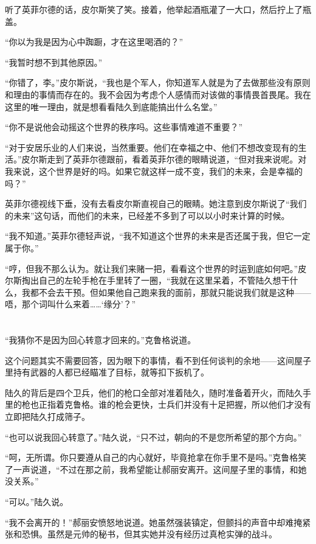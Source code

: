 听了英菲尔德的话，皮尔斯笑了笑。接着，他举起酒瓶灌了一大口，然后拧上了瓶盖。

“你以为我是因为心中踟蹰，才在这里喝酒的？”

“我暂时想不到其他原因。”

“你错了，李。”皮尔斯说，“我也是个军人，你知道军人就是为了去做那些没有原则和理由的事情而存在的。我不会因为考虑个人感情而对该做的事情畏首畏尾。我在这里的唯一理由，就是想看看陆久到底能搞出什么名堂。”

“你不是说他会动摇这个世界的秩序吗。这些事情难道不重要？”

“对于安居乐业的人们来说，当然重要。他们在幸福之中、他们不想改变现有的生活。”皮尔斯走到了英菲尔德跟前，看着英菲尔德的眼睛说道，“但对我来说呢。对我来说，这个世界是好的吗。如果它就这样一成不变，我们的未来，会是幸福的吗？”

英菲尔德视线下垂，没有去看皮尔斯直视自己的眼睛。她注意到皮尔斯说了“我们的未来”这句话，而他们的未来，已经差不多到了可以以小时来计算的时候。

“我不知道。”英菲尔德轻声说，“我不知道这个世界的未来是否还属于我，但它一定属于你。”

“哼，但我不那么认为。就让我们来赌一把，看看这个世界的时运到底如何吧。”皮尔斯掏出自己的左轮手枪在手里转了一圈，“我就在这里呆着，不管陆久想干什么，我都不会去干预。但如果他自己跑来我的面前，那就只能说我们就是这种——唔，那个词叫什么来着……‘缘分’？”

\section*{}

“我猜你不是因为回心转意才回来的。”克鲁格说道。

这个问题其实不需要回答，因为眼下的事情，看不到任何谈判的余地——这间屋子里持有武器的人都已经瞄准了目标，就等扣下扳机了。

陆久的背后是四个卫兵，他们的枪口全部对准着陆久，随时准备着开火，而陆久手里的枪也正指着克鲁格。谁的枪会更快，士兵们并没有十足把握，所以他们才没有立即把陆久打成筛子。

“也可以说我回心转意了。”陆久说，“只不过，朝向的不是您所希望的那个方向。”

“呵，无所谓。你只要遵从自己的内心就好，毕竟抢拿在你手里不是吗。”克鲁格笑了一声说道，“不过在那之前，我希望能让郝丽安离开。这间屋子里的事情，和她没关系。”

“可以。”陆久说。

“我不会离开的！”郝丽安愤怒地说道。她虽然强装镇定，但颤抖的声音中却难掩紧张和恐惧。虽然是元帅的秘书，但其实她并没有经历过真枪实弹的战斗。

